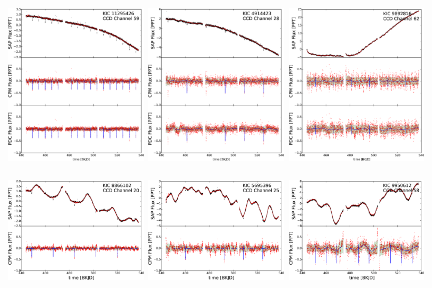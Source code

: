 \begin{figure}[p]
\begin{center}
\includegraphics[width=0.32\textwidth]{figures/cpm/f5a}
\hfill
\includegraphics[width=0.32\textwidth]{figures/cpm/f5b}
\hfill
\includegraphics[width=0.32\textwidth]{figures/cpm/f5c}

\includegraphics[width=0.32\textwidth]{figures/cpm/f5d}
\hfill
\includegraphics[width=0.32\textwidth]{figures/cpm/f5e}
\hfill
\includegraphics[width=0.32\textwidth]{figures/cpm/f5f}


\end{center}
\end{figure}
